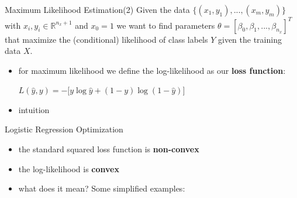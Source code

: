 \documentclass{beamer}
\begin{document}
\begin{frame}{Maximum Likelihood Estimation(2)}
Given the data $\{(x_1, y_1), ..., (x_m, y_m)\}$ with $x_i,y_i \in \mathbb{R}^{n_x+1}$ and $x_0 = 1$ we want to find parameters $\theta=[\beta_0, \beta_1,...,\beta_{n_x}]^T$ that maximize the (conditional) likelihood of class labels $Y$ given the training data $X$.

\begin{itemize}
\item for maximum likelihood we define the log-likelihood as our \textbf{loss function}: 
  \begin{center}
  $L(\hat{y}, y) = - \big[y \log \hat{y} + (1-y) \log (1-\hat{y})\big]$
  \end{center}
\item intuition  
\end{itemize}
\end{frame}

\begin{frame}{Logistic Regression Optimization}
\begin{itemize}
\item the standard squared loss function is \textbf{non-convex}
\item the log-likelihood is \textbf{convex}
\item what does it mean? Some simplified examples:
\end{itemize}


\end{frame}
\end{document}
